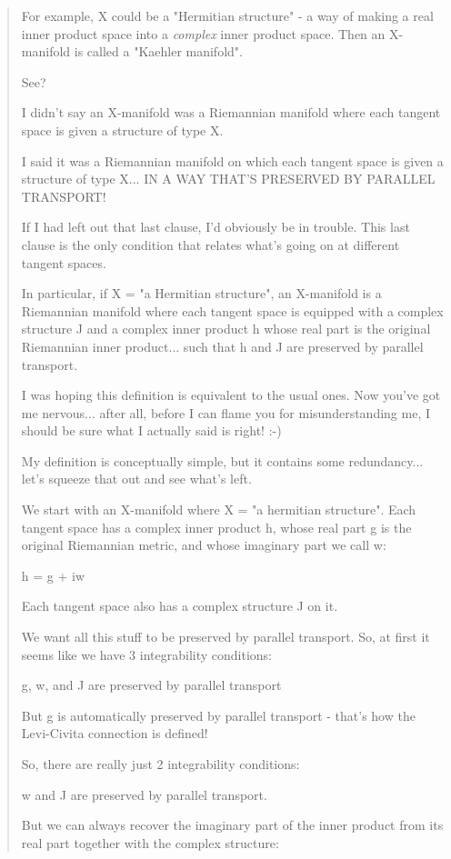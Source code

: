 \begin{quote}
  For example, X could be a "Hermitian structure" - a way of making a
  real inner product space into a \emph{complex} inner product space.  Then 
  an X-manifold is called a "Kaehler manifold".

See?   

I didn't say an X-manifold was a Riemannian manifold where
each tangent space is given a structure of type X.

I said it was a Riemannian manifold on which each tangent space is
given a structure of type X... IN A WAY THAT'S PRESERVED BY PARALLEL
TRANSPORT!

If I had left out that last clause, I'd obviously be in trouble.
This last clause is the only condition that relates what's going
on at different tangent spaces.

In particular, if X = "a Hermitian structure", an X-manifold is a
Riemannian manifold where each tangent space is equipped with a
complex structure J and a complex inner product h whose real part 
is the original Riemannian inner product... such that h and J are
preserved by parallel transport.

I was hoping this definition is equivalent to the usual ones.  
Now you've got me nervous... after all, before I can flame you 
for misunderstanding me, I should be sure what I actually said 
is right!  :-)

My definition is conceptually simple, but it contains
some redundancy... let's squeeze that out and see what's left.

We start with an X-manifold where X = "a hermitian structure".
Each tangent space has a complex inner product h,
whose real part g is the original Riemannian metric, 
and whose imaginary part we call w:

h = g + iw

Each tangent space also has a complex structure J on it.

We want all this stuff to be preserved by parallel transport.
So, at first it seems like we have 3 integrability conditions:

  g, w, and J are preserved by parallel transport

But g is automatically preserved by parallel transport - that's
how the Levi-Civita connection is defined!  

So, there are really just 2 integrability conditions:

  w and J are preserved by parallel transport.

But we can always recover the imaginary part of the inner
product from its real part together with the complex structure:


\end{quote}
